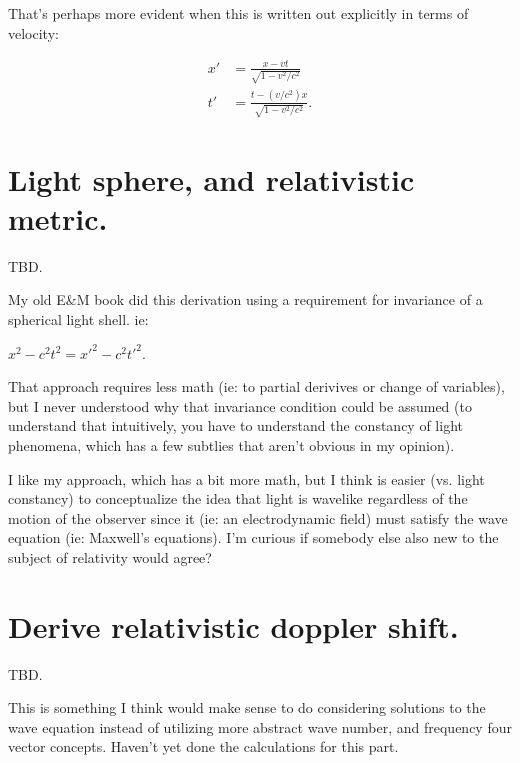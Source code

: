 \documentclass{article}      %
\begin{document}
That's perhaps more evident when this is written out explicitly in terms of velocity:

\begin{align}
x' &= \frac{x - v t}{\sqrt{1 - v^2/c^2}} \\
t' &= \frac{t - (v/c^2) x}{\sqrt{1 - v^2/c^2}}.
\end{align}

\section{ Light sphere, and relativistic metric. }

TBD.

My old E\&M book did this derivation using a requirement for invariance of a spherical light shell.  ie:

$x^2 - c^2 t^2 = x'^2 - c^2 t'^2$.

That approach requires less math (ie: to partial derivives or change of variables), but I never understood why that invariance condition could be assumed (to understand that intuitively, you have to understand the constancy of light phenomena, which has a few subtlies that aren't obvious in my opinion).

I like my approach, which has a bit more math, but I think is easier (vs. light constancy) to conceptualize the idea that light is wavelike regardless of the motion of the observer since it (ie: an electrodynamic field) must satisfy the wave equation (ie: Maxwell's equations).  I'm curious if somebody else also new to the subject of relativity would agree?

\section{ Derive relativistic doppler shift.}

TBD.

This is something I think would make sense to do considering solutions
to the wave
equation instead of utilizing more abstract wave number, and frequency
four vector concepts.  Haven't yet done the calculations for this part.
\end{document}
